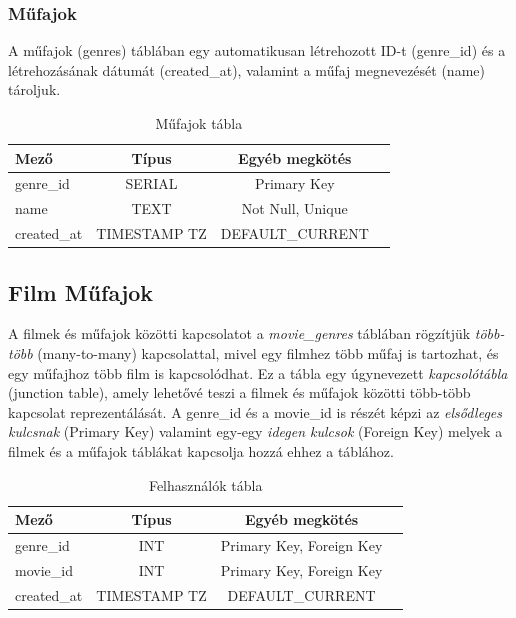 \documentclass[
]{thesis-ekf}
\theoremstyle{definition}
\theoremstyle{remark}
\begin{document}
\subsubsection{Műfajok}
A műfajok (genres) táblában egy automatikusan létrehozott ID-t (genre\_id) és a létrehozásának dátumát (created\_at), valamint a műfaj megnevezését (name) tároljuk.

\begin{table}[!h]
	\centering
	\begin{tabular}{|l|c|c|c|} 
		\hline
		\textbf{Mező} & \textbf{Típus} & \textbf{Egyéb megkötés} \\ 
		\hline
		genre\_id & SERIAL & Primary Key \\ 
		\hline
		name & TEXT &  Not Null, Unique\\
		\hline
		created\_at & TIMESTAMP TZ\footnotemark[\value{footnote}] & DEFAULT\_CURRENT \\ 
		\hline
	\end{tabular}
	\caption{Műfajok tábla}
	\label{tbl-genres}
\end{table}
		
\subsection{Film Műfajok}
A filmek és műfajok közötti kapcsolatot a \emph{movie\_genres} táblában rögzítjük \emph{több-több} (many-to-many) kapcsolattal, mivel egy filmhez több műfaj is tartozhat, és egy műfajhoz több film is kapcsolódhat. Ez a tábla egy úgynevezett \emph{kapcsolótábla} (junction table), amely lehetővé teszi a filmek és műfajok közötti több-több kapcsolat reprezentálását. A genre\_id és a movie\_id is részét képzi az \emph{elsődleges kulcsnak} (Primary Key) valamint egy-egy \emph{idegen kulcsok} (Foreign Key) melyek a filmek és a műfajok táblákat kapcsolja hozzá ehhez a táblához.

\begin{table}[!h]
	\centering
	\begin{tabular}{|l|c|c|c|} 
		\hline
		\textbf{Mező} & \textbf{Típus} & \textbf{Egyéb megkötés} \\ 
		\hline
		genre\_id & INT & Primary Key, Foreign Key \\ 
		\hline
		movie\_id & INT & Primary Key, Foreign Key \\ 
		\hline
		created\_at & TIMESTAMP TZ\footnotemark[\value{footnote}] & DEFAULT\_CURRENT \\ 
		\hline
	\end{tabular}
	\caption{Felhasználók tábla}
	\label{tbl-movie_genres}
\end{table}
\end{document}
